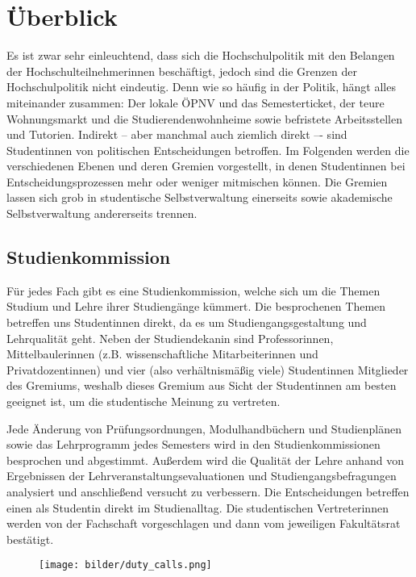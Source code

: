 \section{Überblick}
\label{hopo}



Es ist zwar sehr einleuchtend, dass sich die Hochschulpolitik mit den Belangen der Hochschulteilnehmerinnen beschäftigt, jedoch sind die Grenzen der Hochschulpolitik nicht eindeutig. Denn wie so häufig in der Politik, hängt alles miteinander zusammen: Der lokale ÖPNV und das Semesterticket, der teure Wohnungsmarkt und die Studierendenwohnheime sowie befristete Arbeitsstellen und Tutorien. Indirekt -- aber manchmal auch ziemlich direkt –- sind Studentinnen von politischen Entscheidungen betroffen. Im Folgenden werden die verschiedenen Ebenen und deren Gremien vorgestellt, in denen Studentinnen bei Entscheidungsprozessen mehr oder weniger mitmischen können. Die Gremien lassen sich grob in studentische Selbstverwaltung einerseits sowie akademische Selbstverwaltung andererseits trennen.


\subsection{Studienkommission}
Für jedes Fach gibt es eine Studienkommission, welche sich um die Themen Studium und Lehre ihrer Studiengänge kümmert. Die besprochenen Themen betreffen uns Studentinnen direkt, da es um Studiengangsgestaltung und Lehrqualität geht. Neben der Studiendekanin sind Professorinnen, Mittelbaulerinnen (z.B. wissenschaftliche Mitarbeiterinnen und Privatdozentinnen) und vier (also verhältnismäßig viele) Studentinnen Mitglieder des Gremiums, weshalb dieses Gremium aus Sicht der Studentinnen am besten geeignet ist, um die studentische Meinung zu vertreten.

Jede Änderung von Prüfungsordnungen, Modulhandbüchern und Studienplänen sowie das Lehrprogramm jedes Semesters wird in den Studienkommissionen besprochen und abgestimmt. Außerdem wird die Qualität der Lehre anhand von Ergebnissen der Lehrveranstaltungsevaluationen und Studiengangsbefragungen analysiert und anschließend versucht zu verbessern. Die Entscheidungen betreffen einen als Studentin direkt im Studienalltag. Die studentischen Vertreterinnen werden von der Fachschaft vorgeschlagen und dann vom jeweiligen Fakultätsrat bestätigt.

\begin{figure}[b]
    \centering
     \texttt{[image: bilder/duty\_calls.png]}
\end{figure}

